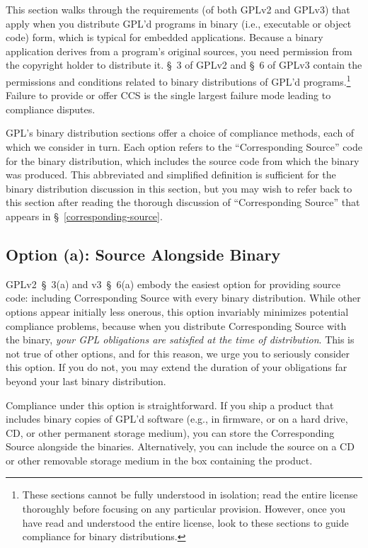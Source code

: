 This section walks through the requirements (of both GPLv2 and GPLv3) that
apply when you distribute GPL'd programs in binary (i.e., executable or
object code) form, which is typical for embedded applications.  Because a
binary application derives from a program's original sources, you need
permission from the copyright holder to distribute it.  \S~3 of GPLv2 and
\S~6 of GPLv3 contain the permissions and conditions related to binary
distributions of GPL'd programs.\footnote{These sections cannot be fully
  understood in isolation; read the entire license thoroughly before
  focusing on any particular provision.  However, once you have read and
  understood the entire license, look to these sections to guide
  compliance for binary distributions.}  Failure to provide or offer CCS is the
single largest failure mode leading to compliance disputes.



GPL's binary distribution sections offer a choice of compliance methods,
each of which we consider in turn.  Each option refers to the
``Corresponding Source'' code for the binary distribution, which includes
the source code from which the binary was produced.  This abbreviated and
simplified definition is sufficient for the binary distribution discussion
in this section, but you may wish to refer back to this section after
reading the thorough discussion of ``Corresponding Source'' that appears
in \S~\ref{corresponding-source}.

\subsection{Option (a): Source Alongside Binary}

GPLv2~\S~3(a) and v3~\S~6(a) embody the easiest option for providing
source code: including Corresponding Source with every binary
distribution.  While other options appear initially less onerous, this
option invariably minimizes potential compliance problems, because when
you distribute Corresponding Source with the binary, \emph{your GPL
  obligations are satisfied at the time of distribution}.  This is not
true of other options, and for this reason, we urge you to seriously
consider this option.  If you do not, you may extend the duration of your
obligations far beyond your last binary distribution.

Compliance under this option is straightforward.  If you ship a product
that includes binary copies of GPL'd software (e.g., in firmware, or on a
hard drive, CD, or other permanent storage medium), you can store the
Corresponding Source alongside the binaries.  Alternatively, you can
include the source on a CD or other removable storage medium in the box
containing the product.

